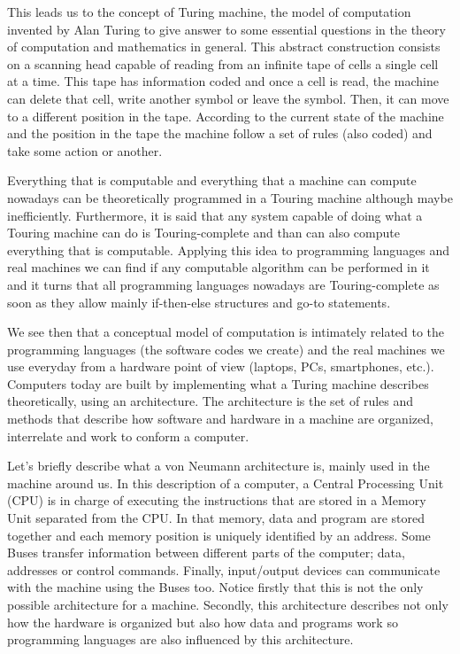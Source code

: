 This leads us to the concept of Turing machine, the model of computation invented by Alan Turing to give answer to some essential questions 
in the theory of computation and mathematics in general. This abstract construction consists on a scanning head capable of reading from an 
infinite tape of cells a single cell at a time. This tape has information coded and once a cell is read, the machine can delete that cell, 
write another symbol or leave the symbol. Then, it can move to a different position in the tape. According to the current state of the 
machine and the position in the tape the machine follow a set of rules (also coded) and take some action or another. 

Everything that is computable and everything that a machine can compute nowadays can be theoretically programmed in a Touring machine 
although maybe inefficiently. Furthermore, it is said that any system capable of doing what a Touring machine can do is Touring-complete and 
than can also compute everything that is computable. Applying this idea to programming languages and real machines we can find if any 
computable algorithm can be performed in it and it turns that all programming languages nowadays are Touring-complete as soon as they allow 
mainly if-then-else structures and go-to statements. 

We see then that a conceptual model of computation is intimately related to the programming languages (the software codes we create) and the 
real machines we use everyday from a hardware point of view (laptops, PCs, smartphones, etc.). Computers today are built by implementing what 
a Turing machine describes theoretically, using an architecture. The architecture is the set of rules and methods that describe how software 
and hardware in a machine are organized, interrelate and work to conform a computer.

Let's briefly describe what a von Neumann architecture is, mainly used in the machine around us. In this description of a computer, a Central 
Processing Unit (CPU) is in charge of executing the instructions that are stored in a Memory Unit separated from the CPU. In that memory, 
data and program are stored together and each memory position is uniquely identified by an address. Some Buses transfer information between 
different parts of the computer; data, addresses or control commands. Finally, input/output devices can communicate with the machine using 
the Buses too. Notice firstly that this is not the only possible architecture for a machine. Secondly, this architecture describes not only 
how the hardware is organized but also how data and programs work so programming languages are also influenced by this architecture. 


